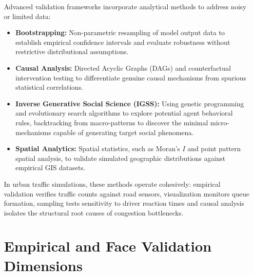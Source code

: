 \documentclass[12pt,a4paper]{report}
\begin{document}
Advanced validation frameworks incorporate analytical methods to address noisy or limited data:
\begin{itemize}
    \item \textbf{Bootstrapping:} Non-parametric resampling of model output data to establish empirical confidence intervals and evaluate robustness without restrictive distributional assumptions.
    \item \textbf{Causal Analysis:} Directed Acyclic Graphs (DAGs) and counterfactual intervention testing to differentiate genuine causal mechanisms from spurious statistical correlations.
    \item \textbf{Inverse Generative Social Science (IGSS):} Using genetic programming and evolutionary search algorithms to explore potential agent behavioral rules, backtracking from macro-patterns to discover the minimal micro-mechanisms capable of generating target social phenomena.
    \item \textbf{Spatial Analytics:} Spatial statistics, such as Moran's $I$ and point pattern spatial analysis, to validate simulated geographic distributions against empirical GIS datasets.
\end{itemize}

In urban traffic simulations, these methods operate cohesively: empirical validation verifies traffic counts against road sensors, visualization monitors queue formation, sampling tests sensitivity to driver reaction times and causal analysis isolates the structural root causes of congestion bottlenecks.

\section{Empirical and Face Validation Dimensions}
\label{sec:empirical_face}
\end{document}

